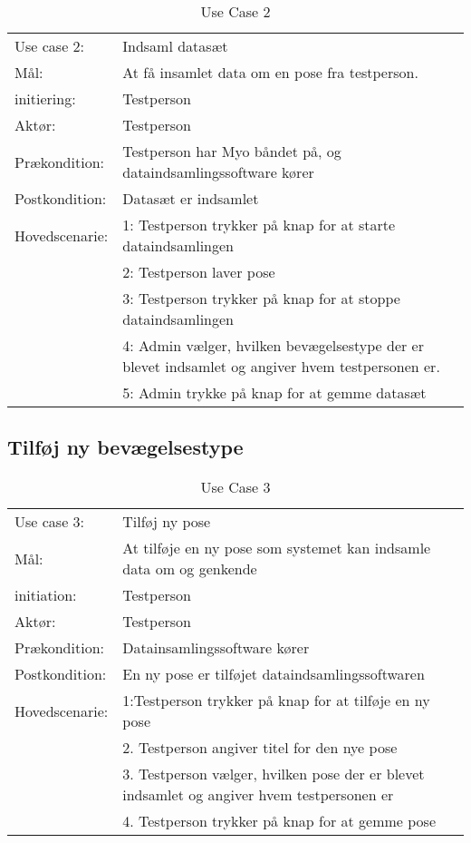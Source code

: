 \begin{center}
	\begin{table}[htbp]
		\begin{tabular}{lp{10cm}}
			\rowcolor{grey} Use case 2:		& Indsaml datasæt \\
			Mål: 	& At få insamlet data om en pose fra testperson. \\
			initiering:	& Testperson\\
			Aktør: & Testperson\\
			Prækondition: & Testperson har Myo båndet på, og dataindsamlingssoftware kører\\
			Postkondition: & Datasæt er indsamlet\\
			Hovedscenarie: & 1: Testperson trykker på knap for at starte dataindsamlingen\\
			& 2: Testperson laver pose\\
			& 3: Testperson trykker på knap for at stoppe dataindsamlingen\\
			& 4: Admin vælger, hvilken bevægelsestype der er blevet indsamlet og angiver hvem testpersonen er.\\
			& 5: Admin trykke på knap for at gemme datasæt\\
		\end{tabular}
		\caption{Use Case 2}
	\end{table}
\end{center}

\subsection{Tilføj ny bevægelsestype}
\begin{center}
	\begin{table}[htbp]
		\begin{tabular}{lp{10cm}}
			\rowcolor{grey} Use case 3:		& Tilføj ny pose\\
			Mål: 	& At tilføje en ny pose som systemet kan indsamle data om og genkende \\
			initiation:	& Testperson\\
			Aktør: & Testperson\\
			Prækondition: & Datainsamlingssoftware kører \\
			Postkondition: & En ny pose er tilføjet dataindsamlingssoftwaren\\
			Hovedscenarie: & 1:Testperson trykker på knap for at tilføje en ny pose\\
			& 2. Testperson angiver titel for den nye pose\\
			& 3. Testperson vælger, hvilken pose der er blevet indsamlet og angiver hvem testpersonen er\\
			& 4. Testperson trykker på knap for at gemme pose\\
		\end{tabular}
		\caption{Use Case 3}
	\end{table}
\end{center}

